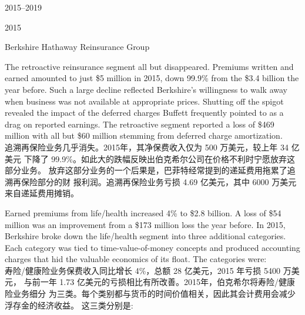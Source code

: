 \begin{chapter}{2015--2019}
\begin{section}{2015}
\begin{subsection}{Berkshire Hathaway Reinsurance Group}
\begin{verseparallel}
  {
    The retroactive reinsurance segment all but disappeared. Premiums written
    and earned amounted to just \$5 million in 2015, down 99.9\% from the \$3.4
    billion the year before. Such a large decline reflected Berkshire's
    willingness to walk away when business was not available at appropriate
    prices. Shutting off the spigot revealed the impact of the deferred charges
    Buffett frequently pointed to as a drag on reported earnings. The
    retroactive segment reported a loss of \$469 million with all but \$60
    million stemming from deferred charge amortization.  \\
  }
  {
    追溯再保险业务几乎消失。2015年，其净保费收入仅为 500 万美元，较上年 34 亿美元
    下降了 99.9\%。如此大的跌幅反映出伯克希尔公司在价格不利时宁愿放弃这部分业务。
    放弃这部分业务的一个后果是，巴菲特经常提到的递延费用拖累了追溯再保险部分的财
    报利润。追溯再保险业务亏损 4.69 亿美元，其中 6000 万美元来自递延费用摊销。
  }
\end{verseparallel}

\begin{verseparallel}
  {
    Earned premiums from life/health increased 4\% to \$2.8 billion. A loss of
    \$54 million was an improvement from a \$173 million loss the year before.
    In 2015, Berkshire broke down the life/health segment into three additional
    categories. Each category was tied to time-value-of-money concepts and
    produced accounting charges that hid the valuable economics of its float.
    The categories were: \\
  }
  {
    寿险/健康险业务保费收入同比增长 4\%，总额 28 亿美元，2015 年亏损 5400 万美元，
    与前一年 1.73 亿美元的亏损相比有所改善。2015年，伯克希尔将寿险/健康险业务细分
    为三类。每个类别都与货币的时间价值相关，因此其会计费用会减少浮存金的经济收益。
    这三类分别是:
  }

\end{verseparallel}


\end{subsection}
\end{section}
\end{chapter}
